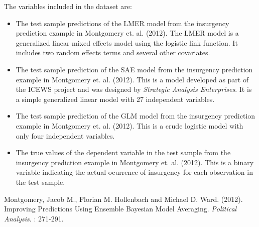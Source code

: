 \documentclass[a4paper]{book}
\begin{document}
%
\begin{Details}\relax
The variables included in the dataset are:
\begin{itemize}

\item {} The test sample predictions of the LMER model from the insurgency prediction example in Montgomery et. al. (2012). The LMER model is a generalized linear mixed effects model using the logistic link function. It includes two random effects terms and several other covariates.
\item {} The test sample prediction of the SAE model from the insurgency prediction example in Montgomery et. al. (2012). This is a model developed as part of the ICEWS project and was designed by \emph{Strategic Analysis Enterprises}. It is a simple generalized linear model with 27 independent variables.
\item {} The test sample prediction of the GLM model from the insurgency prediction example in Montgomery et. al. (2012). This is a crude logistic model with only four independent variables.
\item {} The true values of the dependent variable in the test sample from the insurgency prediction example in Montgomery et. al. (2012). This is a binary variable indicating the actual ocurrence of insurgency for each observation in the test sample.

\end{itemize}

\end{Details}
%
\begin{References}\relax
Montgomery, Jacob M., Florian M. Hollenbach and Michael D. Ward. (2012). Improving Predictions Using Ensemble Bayesian Model Averaging.  \emph{Political Analysis}. : 271-291.
\end{References}
\printindex{}
\end{document}
